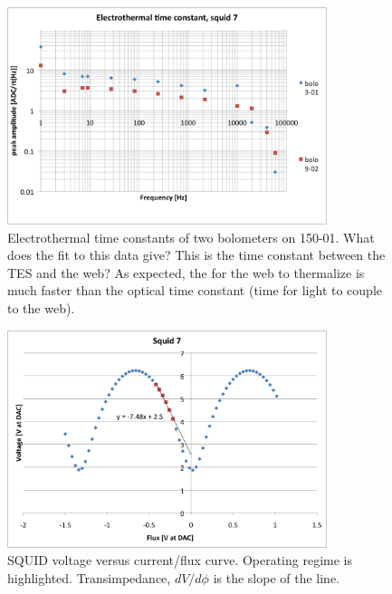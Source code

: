 \begin{figure}[ht!]
\begin{center}
\includegraphics[height=2.5in]{figures/Nb01_squid7_etau_morepts}
\caption{Electrothermal time constants of two bolometers on 150-01. What does the fit to this data give? This is the time constant between the TES and the web? As expected, the for the web to thermalize is much faster than the optical time constant (time for light to couple to the web). 
\label{fig:electrothermal_tau} }
\end{center}
\end{figure}

\begin{figure}[ht!]
\begin{center}
\includegraphics[height=2.5in]{figures/squid7_transimp}
\caption{\ac{SQUID} voltage versus current/flux curve. Operating regime is highlighted. Transimpedance, $dV/d\phi$ is the slope of the line.
\label{fig:squid_transimpedance} }
\end{center}
\end{figure}


